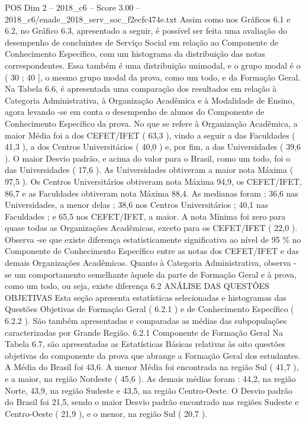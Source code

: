\begin{textsample}{POS Dim 2 – 2018\_c6 – Score 3.00 – 2018\_c6/enade\_2018\_serv\_soc\_f2ecfc474e.txt}
Assim como nos Gráficos 6.1 e 6.2, no Gráfico 6.3, apresentado a seguir, é possível ser feita uma avaliação do desempenho de concluintes de Serviço Social em relação ao Componente de Conhecimento Específico, com um histograma da distribuição das notas correspondentes.
Essa também é uma distribuição unimodal, e o grupo modal é o ( 30 ; 40 ], o mesmo grupo modal da prova, como um todo, e da Formação Geral.
Na Tabela 6.6, é apresentada uma comparação dos resultados em relação à Categoria Administrativa, à Organização Acadêmica e à Modalidade de Ensino, agora levando -se em conta o desempenho de alunos do Componente de Conhecimento Específico da prova.
No que se refere à Organização Acadêmica, a maior Média foi a dos CEFET/IFET ( 63,3 ), vindo a seguir a das Faculdades ( 41,3 ), a dos Centros Universitários ( 40,0 ) e, por fim, a das Universidades ( 39,6 ).
O maior Desvio padrão, e acima do valor para o Brasil, como um todo, foi o das Universidades ( 17,6 ).
As Universidades obtiveram a maior nota Máxima ( 97,5 ).
Os Centros Universitários obtiveram nota Máxima 94,9, os CEFET/IFET, 86,7 e as Faculdades obtiveram nota Máxima 88,4.
As medianas foram : 36,6 nas Universidades, a menor delas ; 38,6 nos Centros Universitários ; 40,1 nas Faculdades ; e 65,5 nos CEFET/IFET, a maior.
A nota Mínima foi zero para quase todas as Organizações Acadêmicas, exceto para os CEFET/IFET ( 22,0 ).
Observa -se que existe diferença estatisticamente significativa ao nível de 95 \% no Componente de Conhecimento Específico entre as notas dos CEFET/IFET e das demais Organizações Acadêmicas.
Quanto à Categoria Administrativa, observa -se um comportamento semelhante àquele da parte de Formação Geral e à prova, como um todo, ou seja, existe diferença 6.2 ANÁLISE DAS QUESTÕES OBJETIVAS Esta seção apresenta estatísticas selecionadas e histogramas das Questões Objetivas de Formação Geral ( 6.2.1 ) e de Conhecimento Específico ( 6.2.2 ).
São também apresentadas e comparadas as médias das subpopulações caracterizadas por Grande Região. 6.2.1 Componente de Formação Geral Na Tabela 6.7, são apresentadas as Estatísticas Básicas relativas às oito questões objetivas do componente da prova que abrange a Formação Geral dos estudantes.
A Média do Brasil foi 43,6.
A menor Média foi encontrada na região Sul ( 41,7 ), e a maior, na região Nordeste ( 45,6 ).
As demais médias foram : 44,2, na região Norte, 43,9, na região Sudeste e 43,5, na região Centro-Oeste.
O Desvio padrão do Brasil foi 21,5, sendo o maior Desvio padrão encontrado nas regiões Sudeste e Centro-Oeste ( 21,9 ), e o menor, na região Sul ( 20,7 ).

\end{textsample}
